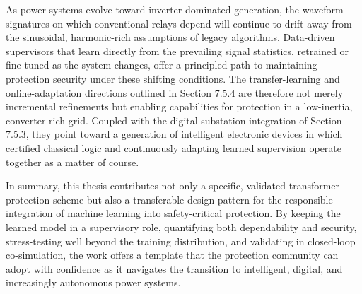 As power systems evolve toward inverter-dominated generation, the waveform signatures on which conventional relays depend will continue to drift away from the sinusoidal, harmonic-rich assumptions of legacy algorithms. Data-driven supervisors that learn directly from the prevailing signal statistics, retrained or fine-tuned as the system changes, offer a principled path to maintaining protection security under these shifting conditions. The transfer-learning and online-adaptation directions outlined in Section 7.5.4 are therefore not merely incremental refinements but enabling capabilities for protection in a low-inertia, converter-rich grid. Coupled with the digital-substation integration of Section 7.5.3, they point toward a generation of intelligent electronic devices in which certified classical logic and continuously adapting learned supervision operate together as a matter of course.

In summary, this thesis contributes not only a specific, validated transformer-protection scheme but also a transferable design pattern for the responsible integration of machine learning into safety-critical protection. By keeping the learned model in a supervisory role, quantifying both dependability and security, stress-testing well beyond the training distribution, and validating in closed-loop co-simulation, the work offers a template that the protection community can adopt with confidence as it navigates the transition to intelligent, digital, and increasingly autonomous power systems.

